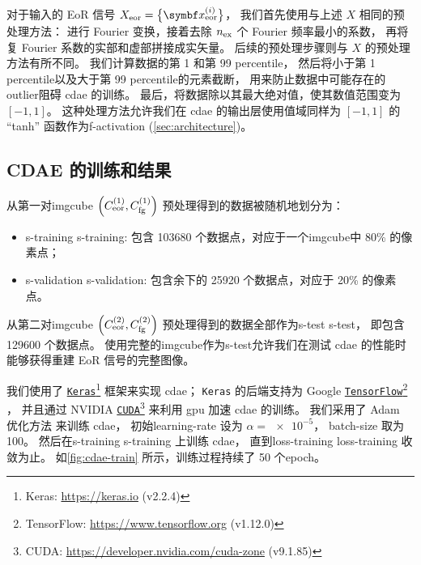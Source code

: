 对于输入的 EoR 信号 $X_{\R{eor}} = \big\{ \B{x}^{(i)}_{\R{eor}} \big\}$，
我们首先使用与上述 $X$ 相同的预处理方法：
进行 Fourier 变换，接着去除 $n_{\mathrm{ex}}$ 个 Fourier 频率最小的系数，
再将复 Fourier 系数的实部和虚部拼接成实矢量。
后续的预处理步骤则与 $X$ 的预处理方法有所不同。
我们计算数据的第 1 和第 99 \ac{percentile}，
然后将小于第 1 \ac{percentile}以及大于第 99 \ac{percentile}的元素截断，
用来防止数据中可能存在的\ac{outlier}阻碍 \ac{cdae} 的训练。
最后，将数据除以其最大绝对值，使其数值范围变为 $[-1, 1]$。
这种处理方法允许我们在 \ac{cdae} 的输出层使用值域同样为 $[-1, 1]$
的 \enquote{tanh} 函数作为\ac{f-activation} (\autoref{sec:architecture})。

\subsection{CDAE 的训练和结果}
\label{sec:cdae-results}

从第一对\ac{imgcube}
$\left( C_{\mathrm{eor}}^{(1)}, C_{\mathrm{fg}}^{(1)} \right)$
预处理得到的数据被随机地划分为：
\begin{itemize}
  \item \acl{s-training} \ac{s-training}:
    包含 \num{103680} 个数据点，对应于一个\ac{imgcube}中 80\% 的像素点；
  \item \acl{s-validation} \ac{s-validation}:
    包含余下的 \num{25920} 个数据点，对应于 20\% 的像素点。
\end{itemize}
从第二对\ac{imgcube}
$\left( C_{\mathrm{eor}}^{(2)}, C_{\mathrm{fg}}^{(2)} \right)$
预处理得到的数据全部作为\acl{s-test} \ac{s-test}，
即包含 \num{129600} 个数据点。
使用完整的\ac{imgcube}作为\acl{s-test}允许我们在测试 \ac{cdae}
的性能时能够获得重建 EoR 信号的完整图像。

我们使用了 \href{https://keras.io}{\texttt{Keras}}\footnote{%
  Keras: \url{https://keras.io} (v2.2.4)}
框架\cite{keras}来实现 \ac{cdae}；
\texttt{Keras} 的后端支持为 Google
\href{https://www.tensorflow.org}{\texttt{TensorFlow}}\footnote{%
  TensorFlow: \url{https://www.tensorflow.org} (v1.12.0)}
\cite{tensorflow}，
并且通过 NVIDIA
\href{https://developer.nvidia.com/cuda-zone}{\texttt{CUDA}}\footnote{%
  CUDA: \url{https://developer.nvidia.com/cuda-zone} (v9.1.85)}
来利用 \ac{gpu} 加速 \ac{cdae} 的训练。
我们采用了 Adam 优化方法\cite{kingma2015} 来训练 \ac{cdae}，
初始\ac{learning-rate} 设为 $\alpha = \num{e-5}$，
\ac{batch-size} 取为 100。
然后在\acl{s-training} \ac{s-training} 上训练 \ac{cdae}，
直到\acl{loss-training} \ac{loss-training} 收敛为止。
如\autoref{fig:cdae-train} 所示，训练过程持续了 50 个\ac{epoch}。


